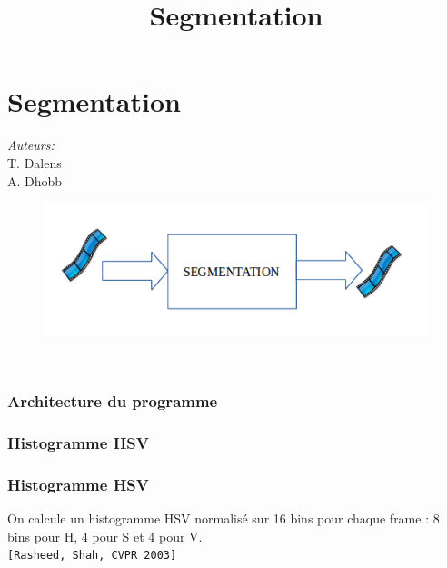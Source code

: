  \section{Segmentation}
 \begin{frame}
 \title{Segmentation}
 \titlepage

    \begin{minipage}{0.3\textwidth}
    \begin{flushleft} \large
    \emph{Auteurs:}\\
    T. Dalens\\
    A. Dhobb
    \end{flushleft}
    \end{minipage}
    \begin{minipage}{0.5\textwidth}
    \begin{flushright} \large
    \begin{figure}
    \includegraphics[width=1.4\textwidth]{Fig/architectureSectionSegmentation.png}
    \end{figure}
    \end{flushright}
    \end{minipage}\\[3cm]
    
 \end{frame}
 
 
\begin{frame}
  \frametitle{Architecture du programme}

\end{frame} 
 
 
 
 \begin{frame}
 \frametitle{Histogramme HSV}
 \end{frame}
 
 \begin{frame}
 \frametitle{Histogramme HSV}
 On calcule un histogramme HSV normalisé sur 16 bins pour chaque frame : 8 bins pour H, 4 pour S et 4 pour V.\\
 \vspace{1cm}
 \verb![Rasheed, Shah, CVPR 2003]!\\
 \end{frame}
 
